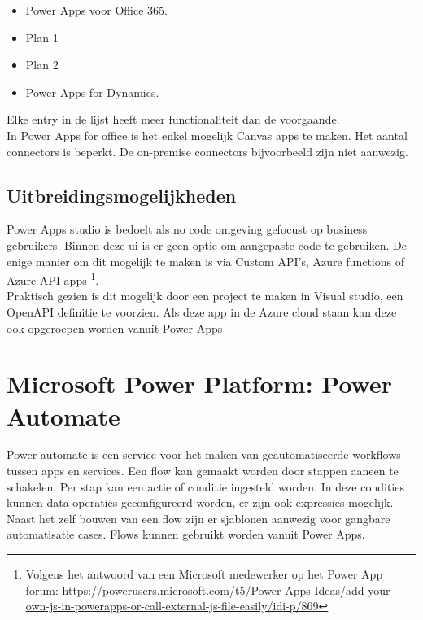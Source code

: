 \begin{itemize}
    \item Power Apps voor Office 365.
    \item Plan 1
    \item Plan 2
    \item Power Apps for Dynamics.
\end{itemize} \autocite{Pohl2019}

Elke entry in de lijst heeft meer functionaliteit dan de voorgaande.\\
In Power Apps for office is het enkel mogelijk Canvas apps te maken. Het aantal connectors is beperkt. De on-premise connectors bijvoorbeeld zijn niet aanwezig.

\subsection{Uitbreidingsmogelijkheden}

Power Apps studio is bedoelt als no code omgeving gefocust op business gebruikers. Binnen deze ui is er geen optie om aangepaste code te gebruiken. De enige manier om dit mogelijk te maken is via Custom API's, Azure functions of Azure API apps \footnote{Volgens het antwoord van een Microsoft medewerker op het Power App forum: \url{https://powerusers.microsoft.com/t5/Power-Apps-Ideas/add-your-own-js-in-powerapps-or-call-external-js-file-easily/idi-p/869}}.\\
Praktisch gezien is dit mogelijk door een project te maken in Visual studio, een OpenAPI definitie te voorzien. Als deze app in de Azure cloud staan kan deze ook opgeroepen worden vanuit Power Apps \autocite{Jugo2019}

\section{Microsoft Power Platform: Power Automate}

Power automate is een service voor het maken van geautomatiseerde workflows tussen apps en services. Een flow kan gemaakt worden door stappen aaneen te schakelen. Per stap kan een actie of conditie ingesteld worden. In deze condities kunnen data operaties geconfigureerd worden, er zijn ook expressies mogelijk. Naast het zelf bouwen van een flow zijn er sjablonen aanwezig voor gangbare automatisatie cases. Flows kunnen gebruikt worden vanuit Power Apps. \autocite{MicrosoftDocs2019f}

